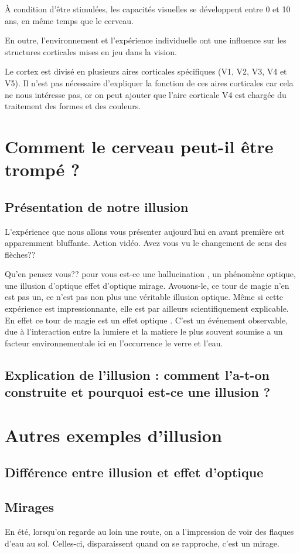 \documentclass[a4paper, 12pt, onecolumn, openany]{report}
\begin{document}
	À condition d'être stimulées, les capacités visuelles se développent entre 0 et 10 ans, en même temps que le cerveau.
	
	En outre, l'environnement et l'expérience individuelle ont une influence sur les structures corticales mises en jeu dans la vision.
	
	Le cortex est divisé en plusieurs aires corticales spécifiques (V1, V2, V3, V4 et V5). Il n'est pas nécessaire d'expliquer la fonction de ces aires corticales car cela ne nous intéresse pas, or on peut ajouter que l'aire corticale V4 est chargée du traitement des formes et des couleurs.

\chapter{Comment le cerveau peut-il être trompé ?}
	\section{Présentation de notre illusion}
	L'expérience que nous allons vous présenter aujourd'hui en avant première est apparemment bluffante. Action vidéo.
	Avez vous vu le changement de sens des flèches?? 
	
	Qu'en pensez vous?? pour vous est-ce une hallucination , un phénomène optique, une illusion d'optique effet d'optique mirage.
Avouons-le, ce tour de magie n'en est pas un, ce n'est pas non plus une véritable illusion optique. 
Même si cette expérience est impressionnante, elle est par ailleurs scientifiquement explicable. En effet ce tour de magie est  un effet optique .  C'est un événement observable, due à l'interaction entre la lumiere et la matiere le plus souvent soumise a un facteur environnementale ici en l'occurrence le verre et l'eau.
	\section{Explication de l'illusion : comment l'a-t-on construite et pourquoi est-ce une illusion ?}
	
\chapter{Autres exemples d'illusion}
	\section{Différence entre illusion et effet d'optique}
	\section{Mirages}
	En été, lorsqu’on regarde au loin une route, on a l’impression de voir des flaques d’eau au sol. Celles-ci, disparaissent quand on se rapproche, c’est un mirage. 
	
\end{document}
